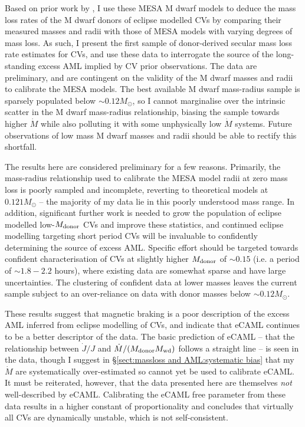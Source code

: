 Based on prior work by \citet{knigge2006,knigge11}, I use these MESA M dwarf models to deduce the mass loss rates of the M dwarf donors of eclipse modelled CVs by comparing their measured masses and radii with those of MESA models with varying degrees of mass loss.
As such, I present the first sample of donor-derived secular mass loss rate estimates for CVs, and use these data to interrogate the source of the long-standing excess AML implied by CV prior observations.
The data are preliminary, and are contingent on the validity of the M dwarf masses and radii to calibrate the MESA models.
The best available M dwarf mass-radius sample is sparsely populated below $\sim 0.12 M_\odot$, so I cannot marginalise over the intrinsic scatter in the M dwarf mass-radius relationship, biasing the sample towards higher $\dot M$ while also polluting it with some unphysically low $\dot M$ systems. Future observations of low mass M dwarf masses and radii should be able to rectify this shortfall.

The results here are considered preliminary for a few reasons. Primarily, the mass-radius relationship used to calibrate the MESA model radii at zero mass loss is poorly sampled and incomplete, reverting to theoretical models at $0.121 M_\odot$ -- the majority of my data lie in this poorly understood mass range.
In addition, significant further work is needed to grow the population of eclipse modelled low-$M_{\rm donor}$ CVs and improve these statistics, and continued eclipse modelling targeting short period CVs will be invaluable to confidently determining the source of excess AML.
Specific effort should be targeted towards confident characterisation of CVs at slightly higher $M_{\rm donor}$ of $\sim0.15$ (i.e. a period of $\sim 1.8 - 2.2$ hours), where existing data are somewhat sparse and have large uncertainties. The clustering of confident data at lower masses leaves the current sample subject to an over-reliance on data with donor masses below $\sim 0.12 M_\odot$.

These results suggest that magnetic braking is a poor description of the excess AML inferred from eclipse modelling of CVs, and indicate that eCAML continues to be a better descriptor of the data.
The basic prediction of eCAML -- that the relationship between $\dot J / J$ and $\dot M / (M_{\rm donor} M_{\rm wd})$ follows a straight line -- is seen in the data, though I suggest in \S\ref{sect:massloss and AML:systematic bias} that my $\dot M$ are systematically over-estimated so cannot yet be used to calibrate eCAML.
It must be reiterated, however, that the data presented here are themselves \textit{not} well-described by eCAML.
Calibrating the eCAML free parameter from these data results in a higher constant of proportionality and concludes that virtually all CVs are dynamically unstable, which is not self-consistent.

